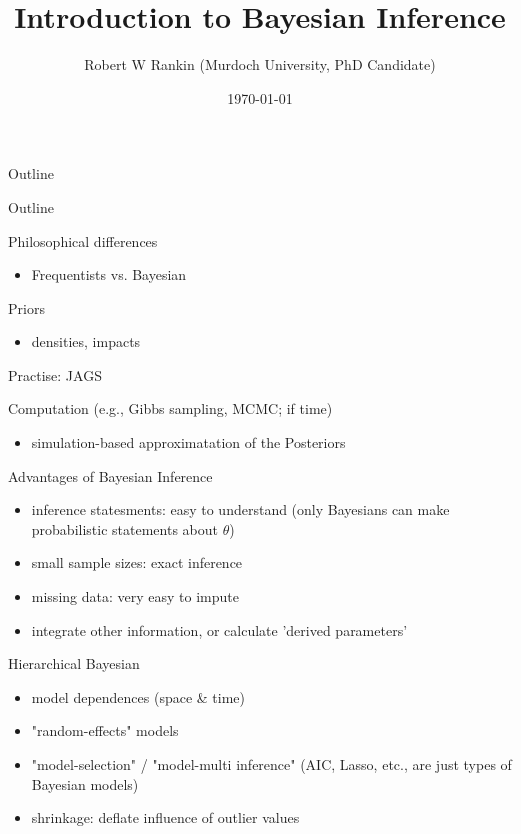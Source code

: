 \documentclass[presentation]{beamer}
\author{Robert W Rankin (Murdoch University, PhD Candidate)}
\date{\today}
\title{Introduction to Bayesian Inference}
\begin{document}
\maketitle
\begin{frame}{Outline}
\tableofcontents
\end{frame}

\begin{frame}[label=sec-1]{Outline}
\begin{block}{Philosophical differences}
\begin{itemize}
\item Frequentists vs. Bayesian
\end{itemize}
\end{block}

\begin{block}{Priors}
\begin{itemize}
\item densities, impacts
\end{itemize}
\end{block}

\begin{block}{Practise: JAGS}
\end{block}
\begin{block}{Computation (e.g., Gibbs sampling, MCMC; if time)}
\begin{itemize}
\item simulation-based approximatation of the Posteriors
\end{itemize}
\end{block}
\end{frame}
\begin{frame}[label=sec-2]{Advantages of Bayesian Inference}
\begin{itemize}
\item inference statesments: easy to understand (only Bayesians can make probabilistic statements about $\theta$)
\item small sample sizes: exact inference
\item missing data: very easy to impute
\item integrate other information, or calculate 'derived parameters'
\end{itemize}
\begin{block}{Hierarchical Bayesian}
\begin{itemize}
\item model dependences (space \& time)
\item "random-effects" models
\item "model-selection" / "model-multi inference" (AIC, Lasso, etc., are just types of Bayesian models)
\item shrinkage: deflate influence of outlier values
\end{itemize}
\end{block}
\end{frame}
\end{document}
